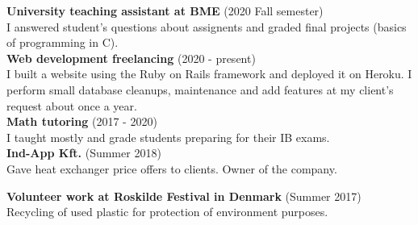 \documentclass{article}
\begin{document}
\noindent
\textbf{University teaching assistant at BME} \hspace{3mm} \color{gray} (2020 Fall semester) \color{black} \\
I answered student's questions about assignents and graded final projects (basics of programming in C).
\smallskip \\

\noindent
\textbf{Web development freelancing} \hspace{3mm} \color{gray} (2020 - present) \color{black} \\
I built a website using the Ruby on Rails framework and deployed it on Heroku. I perform small database cleanups, maintenance and add features at my client's request about once a year.
\smallskip \\

\noindent
\textbf{Math tutoring} \hspace{3mm} \color{gray} (2017 - 2020) \color{black} \\
I taught mostly  and  grade students preparing for their IB exams.
\smallskip \\

\noindent
\textbf{Ind-App Kft.} \color{gray} (Summer 2018) \color{black} \\
Gave heat exchanger price offers to clients. Owner of the company.
\smallskip

\noindent
\textbf{Volunteer work at Roskilde Festival in Denmark} \color{gray} (Summer 2017) \color{black} \\
Recycling of used plastic for protection of environment purposes.
\vspace{5mm}
\end{document}
